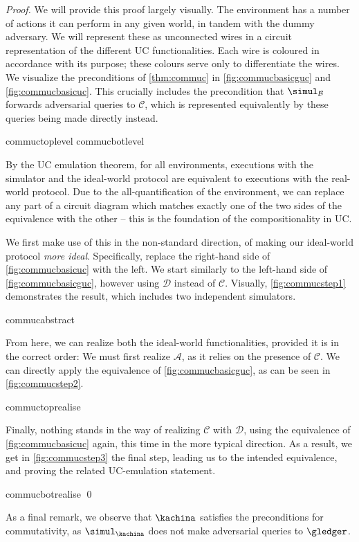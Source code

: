 \begin{proof}
  We will provide this proof largely visually. The environment has a number of
  actions it can perform in any given world, in tandem with the dummy adversary.
  We will represent these as unconnected wires in a circuit representation of
  the different UC functionalities. Each wire is coloured in accordance with its
  purpose; these colours serve only to differentiate the wires. We visualize the
  preconditions of \autoref{thm:commuc} in \autoref{fig:commucbasicguc} and
  \autoref{fig:commucbasicuc}. This crucially includes the precondition that
  $\simul_{\mathcal{B}}$ forwards adversarial queries to $\mathcal{C}$, which is
  represented equivalently by these queries being made directly instead.

  {commuctoplevel}
  {commucbotlevel}

  By the UC emulation theorem, for all environments, executions with the
  simulator and the ideal-world protocol are equivalent to executions with the
  real-world protocol. Due to the all-quantification of the environment, we can
  replace any part of a circuit diagram which matches exactly one of the two
  sides of the equivalence with the other -- this is the foundation of the
  compositionality in UC.

  We first make use of this in the non-standard direction, of making our
  ideal-world protocol \emph{more ideal}. Specifically, replace the right-hand
  side of \autoref{fig:commucbasicuc} with the left. We start similarly to the
  left-hand side of \autoref{fig:commucbasicguc}, however using $\mathcal{D}$
  instead of $\mathcal{C}$. Visually, \autoref{fig:commucstep1} demonstrates the
  result, which includes two independent simulators.

  {commucabstract}

  From here, we can realize both the ideal-world functionalities, provided it is
  in the correct order: We must first realize $\mathcal{A}$, as it relies on the
  presence of $\mathcal{C}$. We can directly apply the equivalence of
  \autoref{fig:commucbasicguc}, as can be seen in \autoref{fig:commucstep2}.

  {commuctoprealise}

  Finally, nothing stands in the way of realizing $\mathcal{C}$ with
  $\mathcal{D}$, using the equivalence of \autoref{fig:commucbasicuc} again,
  this time in the more typical direction. As a result, we get in
  \autoref{fig:commucstep3} the final step, leading us to the intended
  equivalence, and proving the related UC-emulation statement.

  {commucbotrealise}
  \qed
\end{proof}

As a final remark, we observe that $\kachina$ satisfies the preconditions for
commutativity, as $\simul_{\kachina}$ does not make adversarial queries to
$\gledger$.

